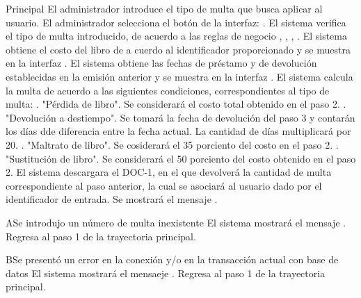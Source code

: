 \begin{UCtrayectoria}{Principal}
	\UCpaso[\UCactor] El administrador introduce el tipo de multa que busca aplicar al usuario.
	\UCpaso[\UCactor] El administrador selecciona el botón  de la interfaz: . 
	\UCpaso[\UCsist]  El sistema verifica el tipo de multa introducido, de acuerdo a las reglas de negocio , , , .
	\UCpaso[\UCsist] El sistema obtiene el costo del libro de a cuerdo al identificador proporcionado y se muestra en la interfaz . 
	\UCpaso[\UCsist] El sistema obtiene las fechas de préstamo y de devolución establecidas en la emisión anterior y se muestra en la interfaz . 
	\UCpaso[\UCsist] El sistema calcula la multa de acuerdo a las siguientes condiciones, correspondientes al tipo de multa: . "Pérdida de libro". Se considerará el costo total obtenido en el paso 2. . "Devolución a destiempo". Se tomará la fecha de devolución del paso 3 y contarán los días dde diferencia entre la fecha actual. La cantidad de días multiplicará por 20. . "Maltrato de libro". Se cosiderará el 35 porciento del costo en el paso 2. . "Sustitución de libro". Se considerará el 50 porciento del costo obtenido en el paso 2.
	\UCpaso[\UCsist] El sistema descargara el DOC-1, en el que devolverá la cantidad de multa correspondiente al paso anterior, la cual se asociará al usuario dado por el identificador de entrada.  
	\UCpaso[\UCsist] Se mostrará el mensaje .
\end{UCtrayectoria}
\begin{UCtrayectoriaA}{A}{Se introdujo un número de multa inexistente}	
			\UCpaso[\UCsist] El sistema mostrará el mensaje .
			\UCpaso[\UCsist] Regresa al paso 1 de la trayectoria principal. 
\end{UCtrayectoriaA}
\begin{UCtrayectoriaA}{B}{Se presentó un error en la conexión y/o en la transacción actual con base de datos}
			\UCpaso[\UCsist] El sistema mostrará el mensaeje .
			\UCpaso[\UCsist] Regresa al paso 1 de la trayectoria principal.
\end{UCtrayectoriaA}
